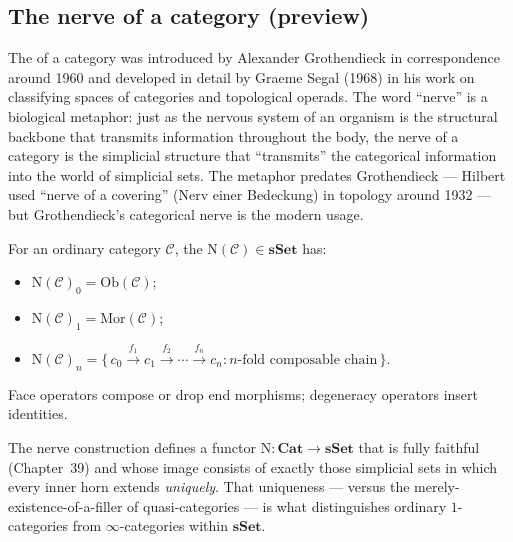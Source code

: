\subsection{The nerve of a category (preview)}

\begin{nameorigin}
The  of a category was introduced by Alexander Grothendieck
in correspondence around 1960 and developed in detail by Graeme Segal
(1968) in his work on classifying spaces of categories and topological
operads. The word ``nerve'' is a biological metaphor: just as the nervous
system of an organism is the structural backbone that transmits
information throughout the body, the nerve of a category is the
simplicial structure that ``transmits'' the categorical information into
the world of simplicial sets. The metaphor predates Grothendieck — Hilbert
used ``nerve of a covering'' (Nerv einer Bedeckung) in topology around
1932 — but Grothendieck's categorical nerve is the modern usage.
\end{nameorigin}

\begin{example_thm}
\label{ex:nerve-preview}
For an ordinary category $\mathcal{C}$, the  $\mathrm{N}(\mathcal{C}) \in
\mathbf{sSet}$ has:
\begin{itemize}
  \item $\mathrm{N}(\mathcal{C})_0 = \mathrm{Ob}(\mathcal{C})$;
  \item $\mathrm{N}(\mathcal{C})_1 = \mathrm{Mor}(\mathcal{C})$;
  \item $\mathrm{N}(\mathcal{C})_n = \{\,c_0 \xrightarrow{f_1} c_1 \xrightarrow{f_2} \cdots \xrightarrow{f_n} c_n : n\text{-fold composable chain}\,\}$.
\end{itemize}
Face operators compose or drop end morphisms; degeneracy operators insert
identities.
\end{example_thm}

\begin{remark}
The nerve construction defines a functor $\mathrm{N} : \mathbf{Cat} \to
\mathbf{sSet}$ that is fully faithful (Chapter~39) and whose image consists
of exactly those simplicial sets in which every inner horn extends
\emph{uniquely}. That uniqueness — versus the merely-existence-of-a-filler
of quasi-categories — is what distinguishes ordinary $1$-categories from
$\infty$-categories within $\mathbf{sSet}$.
\end{remark}

